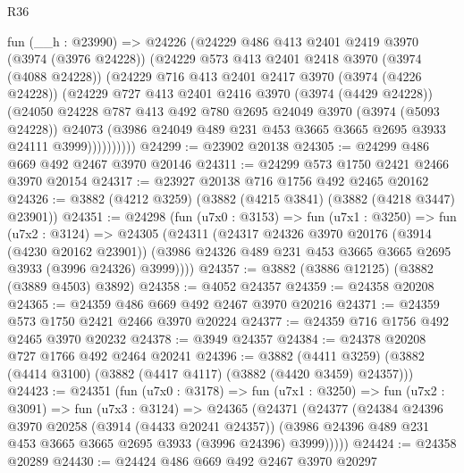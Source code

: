 \begin{lexlean}{R36}
\begin{coremodule}
          fun (__h : @23990) =>
          @24226
            (@24229
              @486
              @413
              @2401
              @2419
              @3970
              (@3974 (@3976 @24228))
              (@24229
                @573
                @413
                @2401
                @2418
                @3970
                (@3974 (@4088 @24228))
                (@24229
                  @716
                  @413
                  @2401
                  @2417
                  @3970
                  (@3974 (@4226 @24228))
                  (@24229
                    @727
                    @413
                    @2401
                    @2416
                    @3970
                    (@3974 (@4429 @24228))
                    (@24050
                      @24228
                      @787
                      @413
                      @492
                      @780
                      @2695
                      @24049
                      @3970
                      (@3974 (@5093 @24228))
                      @24073
                      (@3986 @24049 @489 @231 @453 @3665 @3665 @2695 @3933 @24111 @3999))))))))))
@24299 := @23902 @20138
@24305 := @24299 @486 @669 @492 @2467 @3970 @20146
@24311 := @24299 @573 @1750 @2421 @2466 @3970 @20154
@24317 := @23927 @20138 @716 @1756 @492 @2465 @20162
@24326 := @3882 (@4212 @3259) (@3882 (@4215 @3841) (@3882 (@4218 @3447) @23901))
@24351 := @24298
    (fun (u7x0 : @3153) =>
    fun (u7x1 : @3250) =>
    fun (u7x2 : @3124) =>
    @24305
      (@24311
        (@24317
          @24326
          @3970
          @20176
          (@3914 (@4230 @20162 @23901))
          (@3986 @24326 @489 @231 @453 @3665 @3665 @2695 @3933 (@3996 @24326) @3999))))
@24357 := @3882 (@3886 @12125) (@3882 (@3889 @4503) @3892)
@24358 := @4052 @24357
@24359 := @24358 @20208
@24365 := @24359 @486 @669 @492 @2467 @3970 @20216
@24371 := @24359 @573 @1750 @2421 @2466 @3970 @20224
@24377 := @24359 @716 @1756 @492 @2465 @3970 @20232
@24378 := @3949 @24357
@24384 := @24378 @20208 @727 @1766 @492 @2464 @20241
@24396 := @3882
    (@4411 @3259)
    (@3882 (@4414 @3100) (@3882 (@4417 @4117) (@3882 (@4420 @3459) @24357)))
@24423 := @24351
    (fun (u7x0 : @3178) =>
    fun (u7x1 : @3250) =>
    fun (u7x2 : @3091) =>
    fun (u7x3 : @3124) =>
    @24365
      (@24371
        (@24377
          (@24384
            @24396
            @3970
            @20258
            (@3914 (@4433 @20241 @24357))
            (@3986 @24396 @489 @231 @453 @3665 @3665 @2695 @3933 (@3996 @24396) @3999)))))
@24424 := @24358 @20289
@24430 := @24424 @486 @669 @492 @2467 @3970 @20297

\end{coremodule}
\end{lexlean}
